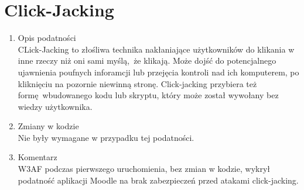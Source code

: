 \begin{enumerate}
\noindent
\begin{minipage}{\linewidth}
\label{erd}
\end{minipage}

\noindent
\begin{minipage}{\linewidth}
\label{erd}
\end{minipage}
\end{enumerate}



\section{Click-Jacking}
\begin{enumerate}
\item Opis podatności\\
CLick-Jacking to złośliwa technika nakłaniające użytkowników do klikania w inne rzeczy niż oni sami myślą, że klikają.
Może dojść do potencjalnego ujawnienia poufnych inforamcji lub przejęcia kontroli nad ich komputerem, po kliknięciu na pozornie niewinną stronę. Click-jacking przybiera też formę wbudowanego kodu lub skryptu, który może został wywołany bez wiedzy użytkownika.
\item Zmiany w kodzie\\
Nie były wymagane w przypadku tej podatności.
\item Komentarz\\
W3AF podczas pierwszego uruchomienia, bez zmian w kodzie, wykrył podatność aplikacji Moodle na brak zabezpieczeń przed atakami click-jacking. 
\end{enumerate}

